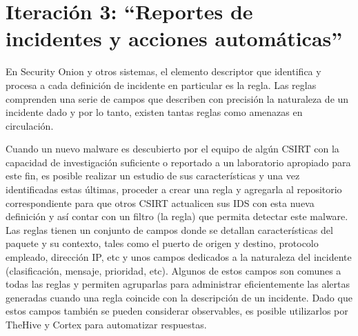 \chapter{Iteración 3: “Reportes de incidentes y acciones automáticas”}
    En Security Onion y otros sistemas, el elemento descriptor que identifica y procesa a cada definición de incidente en particular es la regla. Las reglas comprenden una serie de campos que describen con precisión la naturaleza de un incidente dado y por lo tanto, existen tantas reglas como amenazas en circulación. \par
    Cuando un nuevo malware es descubierto por el equipo de algún CSIRT con la capacidad de investigación suficiente o reportado a un laboratorio apropiado para este fin, es posible realizar un estudio de sus características y una vez identificadas estas últimas, proceder a crear una regla y agregarla al repositorio correspondiente para que otros CSIRT actualicen sus IDS con esta nueva definición y así contar con un filtro (la regla) que permita detectar este malware. Las reglas tienen un conjunto de campos donde se detallan características del paquete y su contexto, tales como el puerto de origen y destino, protocolo empleado, dirección IP, etc y unos campos dedicados a la naturaleza del incidente (clasificación, mensaje, prioridad, etc). Algunos de estos campos son comunes a todas las reglas y permiten agruparlas para administrar eficientemente las alertas generadas cuando una regla coincide con la descripción de un incidente. Dado que estos campos también se pueden considerar observables, es posible utilizarlos por TheHive y Cortex para automatizar respuestas. \par

